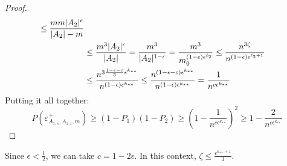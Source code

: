 \begin{proof}
\[\begin{split}
                            \leq \frac{m m |A_2|^\epsilon}{|A_2| - m} \\
                        & \leq \frac{m^3 |A_2|^\epsilon}{|A_2|}
                            = \frac{m^3}{|A_2|^{1-\epsilon}}
                            = \frac{m^3}{m_0^{\parround{1-\epsilon} \epsilon^{\ell_2}}} %
                            \leq \frac{n^{3 \zeta}}{n^{(1-\epsilon)\epsilon^{\ell_2 + 1}}} \\
                        & \leq \frac{n^{3\frac{1-\epsilon-c}{3} \epsilon^{k_{**}}}}{n^{(1-\epsilon)\epsilon^{k_{**}}}}
                            \leq \frac{n^{(1-\epsilon-c) \epsilon^{k_{**}}}}{n^{(1-\epsilon)\epsilon^{k_{**}}}}
                            = \frac{1}{n^{c \epsilon^{k_{**}}}}
                \end{split}
            \]
            Putting it all together:
            \[
                P(\varepsilon^+_{A_{1,s},A_{2,t},m})
                    \geq (1 - P_1) (1 - P_2)
                    \geq \left(1 - \frac{1}{n^{c \epsilon^{k_{**}}}}\right)^2
                    \geq 1 - \frac{2}{n^{c\epsilon^{k_{**}}}}
            \]
        \end{proof}

    \remark\label{subpair_bound_specification}
    Since $\epsilon < \frac{1}{2}$, we can take $c = 1 - 2\epsilon$.
    In this context, $\zeta \leq \frac{\epsilon^{k_{**}+1}}{3}$.

